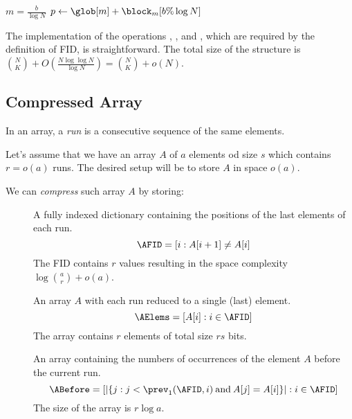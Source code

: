 \begin{algorithm}
\begin{algorithmic}
 
	\State $m = \frac{b}{\log N}$
	\State $p \gets \glob[m] + \block_m[b \% \log N]$
	\State {}
\EndFunction
\end{algorithmic}
\end{algorithm}

The implementation of the operations \rank{}, \select{}, and \inspect{}, which are required by the definition of FID, is straightforward.
The total size of the structure is ${N \choose K} + O(\frac{N \log \log N}{\log N}) = {N \choose K} + o(N)$.

\subsection{Compressed Array}

In an array, a \emph{run} is a consecutive sequence of the same elements.

Let's assume that we have an array $A$ of $a$ elements od size $s$ which contains $r = o(a)$ runs.
The desired setup will be to store $A$ in space $o(a)$.

We can \emph{compress} such array $A$ by storing:
\begin{description}
	\item[\AFID]
	A fully indexed dictionary containing the positions of the last elements of each run.
	$$ \AFID = [i : A[i + 1] \ne A[i] $$
	The FID contains $r$ values resulting in the space complexity $\log {a \choose r} + o(a)$.

	\item[\AElems]
	An array $A$ with each run reduced to a single (last) element.
	$$ \AElems = [A[i] : i \in \AFID] $$
	The array contains $r$ elements of total size $rs$ bits.
	
	\item[\ABefore]
	An array containing the numbers of occurrences of the element $A$ before the current run.
	$$ \ABefore = [|\{ j : j < \prev_1(\AFID, i) \booland A[j] = A[i] \}| : i \in \AFID ] $$
	The size of the array is $r \log a$.
\end{description}

